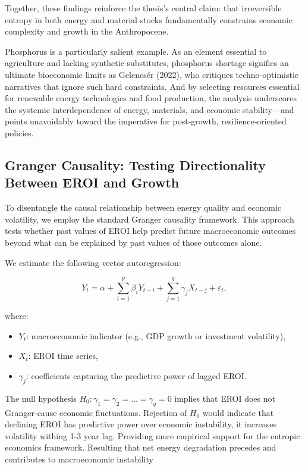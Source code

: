 \documentclass[a4paper,12pt]{article}
\begin{document}
Together, these findings reinforce the thesis’s central claim: that irreversible entropy in both energy and material stocks fundamentally constrains economic complexity and growth in the Anthropocene.  

Phosphorus is a particularly salient example. As an element essential to agriculture and lacking synthetic substitutes, phosphorus shortage signifies an ultimate bioeconomic limits as Gelencsér (2022), who critiques techno-optimistic narratives that ignore such hard constraints. And by selecting resources essential for renewable energy technologies and food production, the analysis underscores the systemic interdependence of energy, materials, and economic stability—and points unavoidably toward the imperative for post‐growth, resilience‐oriented policies.


\subsection{Granger Causality: Testing Directionality Between EROI and Growth}

To disentangle the causal relationship between energy quality and economic volatility, we employ the standard Granger causality framework. This approach tests whether past values of EROI help predict future macroeconomic outcomes beyond what can be explained by past values of those outcomes alone.

We estimate the following vector autoregression:

\[
Y_{t} = \alpha + \sum_{i=1}^{p} \beta_{i} Y_{t-i} + \sum_{j=1}^{q} \gamma_{j} X_{t-j} + \varepsilon_{t},
\]

where:
\begin{itemize}
    \item \( Y_t \): macroeconomic indicator (e.g., GDP growth or investment volatility),
    \item \( X_t \): EROI time series,
    \item \( \gamma_j \): coefficients capturing the predictive power of lagged EROI.
\end{itemize}

The null hypothesis \( H_0: \gamma_1 = \gamma_2 = \dots = \gamma_q = 0 \) implies that EROI does not Granger-cause economic fluctuations. Rejection of \( H_0 \) would indicate that declining EROI has predictive power over economic instability, it increases volatility withing 1-3 year lag. Providing more empirical support for the entropic economics framework. Resulting that net energy degradation precedes and contributes to macroeconomic instability
\end{document}
